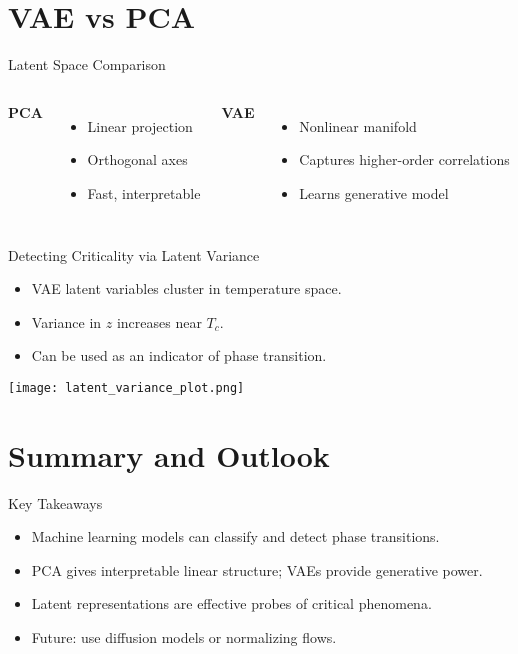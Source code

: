 \documentclass{beamer}
\begin{document}
\section{VAE vs PCA}
\begin{frame}{Latent Space Comparison}
\begin{columns}
\textbf{PCA}
\begin{itemize}
    \item Linear projection
    \item Orthogonal axes
    \item Fast, interpretable
\end{itemize}
\textbf{VAE}
\begin{itemize}
    \item Nonlinear manifold
    \item Captures higher-order correlations
    \item Learns generative model
\end{itemize}
\end{columns}
\end{frame}

\begin{frame}{Detecting Criticality via Latent Variance}
\begin{itemize}
    \item VAE latent variables cluster in temperature space.
    \item Variance in $z$ increases near $T_c$.
    \item Can be used as an indicator of phase transition.
\end{itemize}
\texttt{[image: latent\_variance\_plot.png]}
\end{frame}

\section{Summary and Outlook}
\begin{frame}{Key Takeaways}
\begin{itemize}
    \item Machine learning models can classify and detect phase transitions.
    \item PCA gives interpretable linear structure; VAEs provide generative power.
    \item Latent representations are effective probes of critical phenomena.
    \item Future: use diffusion models or normalizing flows.
\end{itemize}
\end{frame}
\end{document}
